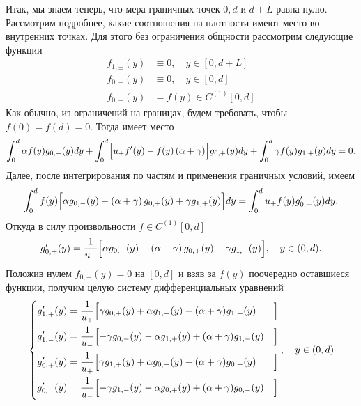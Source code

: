 \documentclass[12pt,a4paper]{article}
\begin{document}
Итак, мы знаем теперь, что мера граничных точек $0, d$ и $d + L$ равна нулю. Рассмотрим подробнее, какие соотношения на плотности имеют место во внутренних точках. Для этого без ограничения общности рассмотрим следующие функции
\begin{equation*}
    \begin{aligned}
        f_{1, \pm} (y) &\equiv 0, \quad y \in [0, d + L]\\
        f_{0, -} (y) &\equiv 0, \quad y \in [0, d]\\
        f_{0, +} (y) & = f(y) \in C^{(1)} [0, d]
    \end{aligned}
\end{equation*}
Как обычно, из ограничений на границах, будем требовать, чтобы $f (0) = f (d) = 0$. Тогда имеет место
\begin{equation*}
    \begin{aligned}
        \int_0^{d} \alpha f(y) g_{0,-} (y) dy + \int_0^{d} \Bigl[u_+ f' (y) - f(y) \left(\alpha + \gamma \right) \Bigr] g_{0,+} (y) dy + \int_0^{d} \gamma f(y) g_{1,+} (y) dy= 0.
    \end{aligned}
\end{equation*}
Далее, после интегрирования по частям и применения граничных условий, имеем
$$\int_0^{d} f(y) \Bigl[ \alpha g_{0,-} (y) - \left(\alpha + \gamma \right) g_{0,+} (y) + \gamma g_{1,+} (y) \Bigr] dy = \int_0^{d} u_+ f (y) g_{0,+}' (y) dy .$$
Откуда в силу произвольности $f \in C^{(1)} [0, d]$
$$g_{0,+}' (y) = \frac{1}{u_+} \Bigl[ \alpha g_{0,-} (y) - \left(\alpha + \gamma \right) g_{0,+} (y) + \gamma g_{1,+} (y) \Bigr], \quad y \in (0, d).$$
Положив нулем $f_{0, +} (y) = 0$ на $[0, d]$ и взяв за $f (y)$ поочередно оставшиеся функции, получим целую систему дифференциальных уравнений
\begin{equation*}
\left\{ \begin{aligned} 
g_{1, +}'(y) &= \frac{1}{u_+} \Bigl[ \gamma g_{0, +}(y) + \alpha g_{1, -}(y) -(\alpha + \gamma) g_{1, +}(y)&\Bigr]\\
g_{1, -}'(y) &= \frac{1}{u_-} \Bigl[ -\gamma g_{0, -}(y) - \alpha g_{1, +}(y) + (\alpha + \gamma) g_{1, -}(y)&\Bigr]\\
g_{0, +}'(y) &= \frac{1}{u_+} \Bigl[ \gamma g_{1, +}(y) + \alpha g_{0, -}(y) - (\alpha + \gamma) g_{0, +}(y)&\Bigr]\\
g_{0, -}'(y) &= \frac{1}{u_-} \Bigl[ -\gamma g_{1, -}(y) - \alpha g_{0, +}(y) + (\alpha + \gamma) g_{0, -}(y)&\Bigr]
\end{aligned}
\right., \quad y \in (0, d)
\end{equation*}
\end{document}
